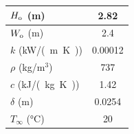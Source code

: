 \begin{table}[!ht]
\begin{center}
\begin{tabular}{|c|c|c|}
\multicolumn{2}{|l|}{$H_{\rm o}$ (m)}               &  \multicolumn{1}{c|}{2.82}        \\ \hline
\multicolumn{2}{|l|}{$W_{\rm o}$ (m)}               &  \multicolumn{1}{c|}{2.4}         \\ \hline
\multicolumn{2}{|l|}{$k$ (\si{kW/(m.K)})}         &  \multicolumn{1}{c|}{0.00012}     \\ \hline
\multicolumn{2}{|l|}{$\rho$ (kg/m$^3$)}           &  \multicolumn{1}{c|}{737}         \\ \hline
\multicolumn{2}{|l|}{$c$ (\si{kJ/(kg.K)})}        &  \multicolumn{1}{c|}{1.42}        \\ \hline
\multicolumn{2}{|l|}{$\delta$ (m)}                &  \multicolumn{1}{c|}{0.0254}      \\ \hline
\multicolumn{2}{|l|}{$T_\infty$ (\si{\celsius})}  &  \multicolumn{1}{c|}{20}          \\ \hline
\end{tabular}
\end{center}
\end{table}

